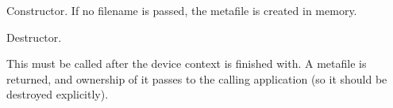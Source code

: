 

Constructor. If no filename is passed, the metafile is created
in memory.



Destructor.

\label{wxmetafiledcclose}


This must be called after the device context is finished with. A
metafile is returned, and ownership of it passes to the calling
application (so it should be destroyed explicitly).

